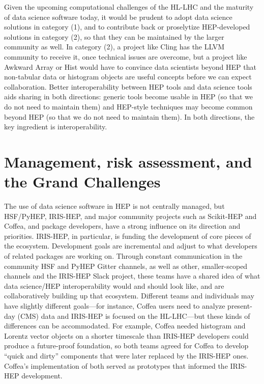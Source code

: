 \documentclass[12pt,a4paper]{article}
\begin{document}
Given the upcoming computational challenges of the HL-LHC and the maturity of data science software today, it would be prudent to adopt data science solutions in category (1), and to contribute back or proselytize HEP-developed solutions in category (2), so that they can be maintained by the larger community as well. In category (2), a project like Cling has the LLVM community to receive it, once technical issues are overcome, but a project like Awkward Array or Hist would have to convince data scientists beyond HEP that non-tabular data or histogram objects are useful concepts before we can expect collaboration. Better interoperability between HEP tools and data science tools aids sharing in both directions: generic tools become usable in HEP (so that we do not need to maintain them) and HEP-style techniques may become common beyond HEP (so that we do not need to maintain them). In both directions, the key ingredient is interoperability.

\section{Management, risk assessment, and the Grand Challenges}

The use of data science software in HEP is not centrally managed, but HSF/PyHEP, IRIS-HEP, and major community projects such as Scikit-HEP and Coffea, and package developers, have a strong influence on its direction and priorities. IRIS-HEP, in particular, is funding the development of core pieces of the ecosystem.
%
Development goals are incremental and adjust to what developers of related packages are working on. Through constant communication in the community HSF and PyHEP Gitter channels, as well as other, smaller-scoped channels and the IRIS-HEP Slack project, these teams have a shared idea of what data science/HEP interoperability would and should look like, and are collaboratively building up that ecosystem. Different teams and individuals may have slightly different goals---for instance, Coffea users need to analyze present-day (CMS) data and IRIS-HEP is focused on the HL-LHC---but these kinds of differences can be accommodated. For example, Coffea needed histogram and Lorentz vector objects on a shorter timescale than IRIS-HEP developers could produce a future-proof foundation, so both teams agreed for Coffea to develop ``quick and dirty'' components that were later replaced by the IRIS-HEP ones. Coffea's implementation of both served as prototypes that informed the IRIS-HEP development.
\end{document}
